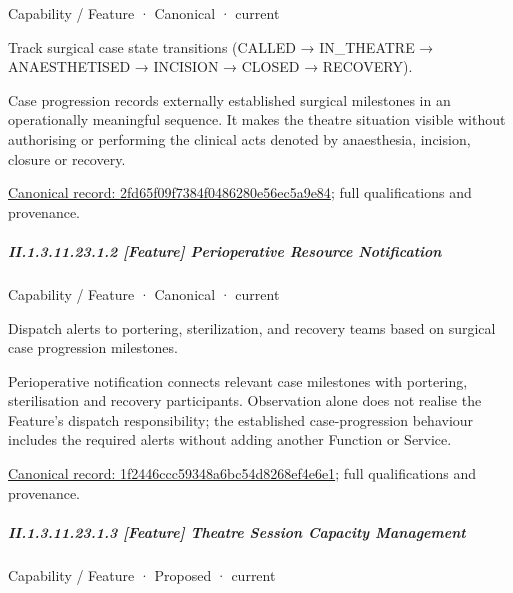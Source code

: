 \label{element:2fd65f09f7384f0486280e56ec5a9e84}
{\small Capability / Feature · Canonical · current}\par

Track surgical case state transitions (CALLED → IN\_THEATRE → ANAESTHETISED → INCISION → CLOSED → RECOVERY).



Case progression records externally established surgical milestones in an operationally meaningful sequence. It makes the theatre situation visible without authorising or performing the clinical acts denoted by anaesthesia, incision, closure or recovery.


{\footnotesize \href{../../../../continuum/strategy/capability/feature/2fd65f09f7384f0486280e56ec5a9e84.md}{Canonical record: 2fd65f09f7384f0486280e56ec5a9e84}; full qualifications and provenance.}\par
\subparagraph*{II.1.3.11.23.1.2 [Feature] Perioperative Resource Notification}
\label{navigation:II.1.3.11.23.1.2}

\label{element:1f2446ccc59348a6bc54d8268ef4e6e1}
{\small Capability / Feature · Canonical · current}\par

Dispatch alerts to portering, sterilization, and recovery teams based on surgical case progression milestones.



Perioperative notification connects relevant case milestones with portering, sterilisation and recovery participants. Observation alone does not realise the Feature's dispatch responsibility; the established case-progression behaviour includes the required alerts without adding another Function or Service.


{\footnotesize \href{../../../../continuum/strategy/capability/feature/1f2446ccc59348a6bc54d8268ef4e6e1.md}{Canonical record: 1f2446ccc59348a6bc54d8268ef4e6e1}; full qualifications and provenance.}\par
\subparagraph*{II.1.3.11.23.1.3 [Feature] Theatre Session Capacity Management}
\label{navigation:II.1.3.11.23.1.3}

\label{element:258c27077caf4bf88e562e8dd607bdfd}
{\small Capability / Feature · Proposed · current}\par

